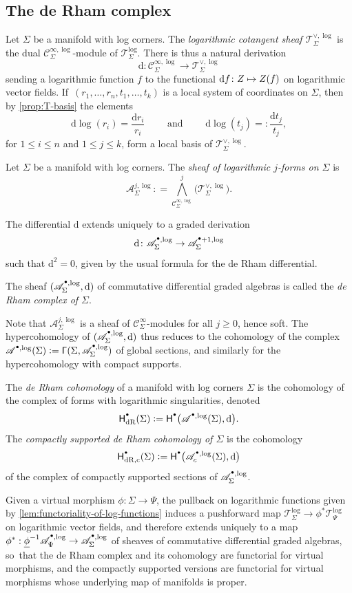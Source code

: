 \documentclass[JEP,XML,SOM,Unicode,NoFloatCountersInSection,published]{cedram}
\let\oldbullet\bullet
\renewcommand{\bullet}{{\raisebox{1pt}{$\scriptscriptstyle\oldbullet$}}}
\newcommand\mto{\mathchoice{\longmapsto}{\mapsto}{\mapsto}{\mapsto}}
\newcommand{\rbirac}[1]{\bigl(#1\bigr)}
\newcommand{\bcoH}[2][\bullet]{\mathsf{H}^{#1}\rbirac{#2}}
\theoremstyle{definition}
\theoremstyle{remark}
\let\defn\emph
\renewcommand{\le}{\leqslant}
\renewcommand{\ge}{\geqslant}
\newcommand{\defas}{\mathrel{\mathop:}=}
\newcommand{\Cinf}[1]{\mathscr{C}^{\infty}_{#1}}
\newcommand{\Cinflog}[1]{\mathscr{C}^{\infty,\log}_{#1}}
\newcommand{\dd}{\mathrm{d}}
\newcommand{\dlog}[1]{\frac{\dd#1}{#1}}
\newcommand{\cAlog}[2][\bullet]{\mathscr{A}^{#1,\log}_{#2}}
\newcommand{\Alogc}[2][\bullet]{\mathscr{A}^{#1,\log}_c(#2)}
\newcommand{\VFlog}[1]{\mathcal{T}^{\log}_{#1}}
\newcommand{\coVFlog}[1]{\mathcal{T}^{\vee,\log}_{#1}}
\newcommand{\Sig}{\Sigma}
\newcommand{\uphi}{\underline{\phi}}
\newcommand{\sect}[1]{\mathsf{\Gamma}(#1)}
\newcommand{\HdR}[2][\bullet]{\mathsf{H}_{\mathrm{dR}}^{#1}(#2)}
\newcommand{\HdRc}[2][\bullet]{\mathsf{H}_{\mathrm{dR},\mathrm{c}}^{#1}(#2)}
\begin{document}
\subsection{The de Rham complex}
Let $\Sig$ be a manifold with log corners. The \defn{logarithmic cotangent sheaf $\coVFlog{\Sig}$} is the dual $\Cinflog{\Sig}$-module of $\VFlog{\Sig}$. There is thus a natural derivation
\[
\dd\colon \Cinflog{\Sig} \to \coVFlog{\Sig}
\]
sending a logarithmic function $f$ to the functional $\dd f \colon Z \mto Z(f)$ on logarithmic vector fields. If~$(r_1,\ldots,r_n,t_1,\ldots,t_k)$ is a local system of coordinates on $\Sig$, then by \autoref{prop:T-basis} the elements
\[
\dd \log(r_i) = \dlog{r_i} \qquad \mbox{ and } \qquad \dd\log(t_j) =: \dlog{t_j},
\]
for $1 \le i \le n$ and $1 \le j \le k$, form a local basis of $\coVFlog{\Sig}$.

\begin{definition}
Let $\Sig$ be a manifold with log corners. The \defn{sheaf of logarithmic $j$-forms on $\Sig$} is
\[
\cAlog[j]{\Sig} \defas {\bigwedge}^j_{\Cinflog{\Sig}}\bigl(\coVFlog{\Sig}\bigr).
\]
\end{definition}
The differential $\dd$ extends uniquely to a graded derivation
\[
\dd\colon \cAlog{\Sig} \to \cAlog[\bullet+1]{\Sig}
\]
such that $\dd^2=0$, given by the usual formula for the de Rham differential.

\begin{lemma}
The sheaf $(\cAlog{\Sig},\dd)$ of commutative differential graded algebras is called the \defn{de Rham complex of $\Sig$}.
\end{lemma}

Note that $\cAlog[j]{\Sig}$ is a sheaf of $\Cinf{\Sig}$-modules for all $j\ge0 $, hence soft. The hypercohomology of $(\cAlog{\Sig},\dd)$ thus reduces to the cohomology of the complex $\cAlog{}(\Sig) \defas \sect{\Sig,\cAlog{\Sig}}$ of global sections, and similarly for the hypercohomology with compact supports.

\begin{definition}
The \defn{de Rham cohomology} of a manifold with log corners $\Sig$ is the cohomology of the complex of forms with logarithmic singularities, denoted
\[
\HdR{\Sig} \defas \bcoH{\cAlog{}(\Sig),\dd}.
\]
The \defn{compactly supported de Rham cohomology of $\Sig$} is the cohomology
\[
\HdRc{\Sig}\defas \bcoH{\Alogc{\Sig},\dd}
\]
of the complex of compactly supported sections of $\cAlog{\Sig}$.
\end{definition}

Given a virtual morphism $\phi \colon \Sig \to \Psi$, the pullback on logarithmic functions given by \autoref{lem:functoriality-of-log-functions} induces a pushforward map $\VFlog{\Sig} \to \phi^*\VFlog{\Psi}$ on logarithmic vector fields, and therefore extends uniquely to a map $\phi^* : \uphi^{-1}\cAlog{\Psi} \to \cAlog{\Sig}$ of sheaves of commutative differential graded algebras, so~that the de Rham complex and its cohomology are functorial for virtual morphisms, and the compactly supported versions are functorial for virtual morphisms whose underlying map of manifolds is proper.
\end{document}
